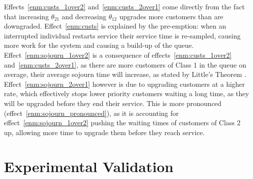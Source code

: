 \documentclass{article}
\begin{document}
Effects~\ref{enm:custs_1over2} and~\ref{enm:custs_2over1} come directly from the
fact that increasing $\theta_{21}$ and decreasing $\theta_{12}$ upgrades more
customers than are downgraded. Effect~\ref{enm:custs} is explained by the
pre-emption: when an interrupted individual restarts service their service time
is re-sampled, causing more work for the system and causing a build-up of the
queue.
Effect~\ref{enm:sojourn_1over2} is a consequence of
effects~\ref{enm:custs_1over2} and~\ref{enm:custs_2over1}, as there are more
customers of Class 1 in the queue on average, their average sojourn time will
increase, as stated by Little's Theorem \cite{little61}.
Effect~\ref{enm:sojourn_2over1} however is due to upgrading customers at a
higher rate, which effectively stops lower priority customers waiting a long
time, as they will be upgraded before they end their service.
This is more pronounced (effect~\ref{enm:sojourn_pronounced}), as it is
accounting for effect~\ref{enm:sojourn_1over2} pushing the waiting times of
customers of Class 2 up, allowing more time to upgrade them before they reach
service.

\section{Experimental Validation}\label{sec:validation}




\end{document}
